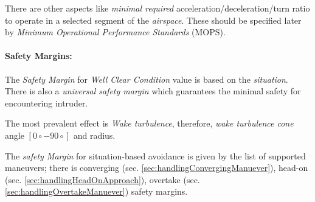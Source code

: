 There are other aspects like \emph{minimal required} acceleration/deceleration/turn ratio to operate in a selected segment of the \emph{airspace}. These should be specified later by \emph{Minimum Operational Performance Standards} (MOPS).

\paragraph{Safety Margins:} The \emph{Safety Margin} for \emph{Well Clear Condition} value is based on the \emph{situation}. There is also a \emph{universal safety margin} which guarantees the minimal safety for encountering intruder. 

The most prevalent effect is \emph{Wake turbulence}, therefore, \emph{wake turbulence cone} angle $[0\circ -90\circ ]$ and radius. 

The \emph{safety Margin} for situation-based avoidance is given by the list of supported  maneuvers; there is converging (sec. \ref{sec:handlingConvergingManuever}), head-on (sec. \ref{sec:handlingHeadOnApproach}), overtake (sec. \ref{sec:handlingOvertakeManuever}) safety margins.


